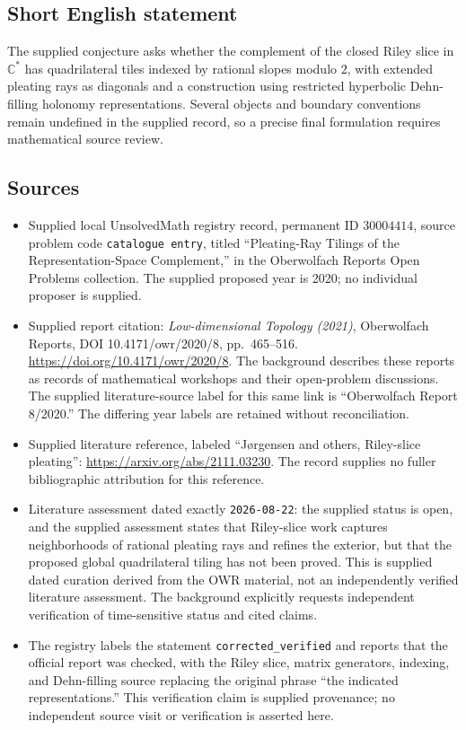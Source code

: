 \documentclass[11pt]{article}
\newcommand{\C}{\mathbb{C}}
\begin{document}
\subsection{Short English statement}
The supplied conjecture asks whether the complement of the closed Riley slice in \(\C^*\) has quadrilateral tiles indexed by rational slopes modulo \(2\), with extended pleating rays as diagonals and a construction using restricted hyperbolic Dehn-filling holonomy representations. Several objects and boundary conventions remain undefined in the supplied record, so a precise final formulation requires mathematical source review.
\subsection{Sources}
\begin{itemize}
\item Supplied local UnsolvedMath registry record, permanent ID \(30004414\), source problem code \texttt{catalogue entry}, titled ``Pleating-Ray Tilings of the Representation-Space Complement,'' in the Oberwolfach Reports Open Problems collection. The supplied proposed year is 2020; no individual proposer is supplied.
\item Supplied report citation: \emph{Low-dimensional Topology (2021)}, Oberwolfach Reports, DOI 10.4171/owr/2020/8, pp.\ 465--516. \url{https://doi.org/10.4171/owr/2020/8}. The background describes these reports as records of mathematical workshops and their open-problem discussions. The supplied literature-source label for this same link is ``Oberwolfach Report 8/2020.'' The differing year labels are retained without reconciliation.
\item Supplied literature reference, labeled ``Jørgensen and others, Riley-slice pleating'': \url{https://arxiv.org/abs/2111.03230}. The record supplies no fuller bibliographic attribution for this reference.
\item Literature assessment dated exactly \texttt{2026-08-22}: the supplied status is open, and the supplied assessment states that Riley-slice work captures neighborhoods of rational pleating rays and refines the exterior, but that the proposed global quadrilateral tiling has not been proved. This is supplied dated curation derived from the OWR material, not an independently verified literature assessment. The background explicitly requests independent verification of time-sensitive status and cited claims.
\item The registry labels the statement \texttt{corrected\_verified} and reports that the official report was checked, with the Riley slice, matrix generators, indexing, and Dehn-filling source replacing the original phrase ``the indicated representations.'' This verification claim is supplied provenance; no independent source visit or verification is asserted here.
\end{itemize}
\end{document}
